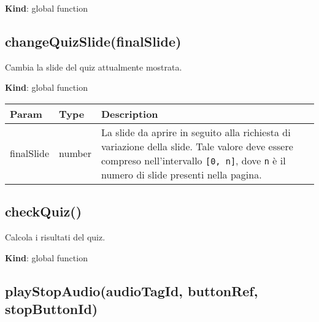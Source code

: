 \textbf{Kind}: global function\\

\hypertarget{changequizslidefinalslide-1}{%
\subsection{changeQuizSlide(finalSlide)}\label{changequizslidefinalslide-1}}

Cambia la slide del quiz attualmente mostrata.

\textbf{Kind}: global function

\begin{longtable}[]{@{}lll@{}}
\toprule
\begin{minipage}[b]{0.30\columnwidth}\raggedright
Param\strut
\end{minipage} & \begin{minipage}[b]{0.30\columnwidth}\raggedright
Type\strut
\end{minipage} & \begin{minipage}[b]{0.30\columnwidth}\raggedright
Description\strut
\end{minipage}\tabularnewline
\midrule
\endhead
\begin{minipage}[t]{0.30\columnwidth}\raggedright
finalSlide\strut
\end{minipage} & \begin{minipage}[t]{0.30\columnwidth}\raggedright
number\strut
\end{minipage} & \begin{minipage}[t]{0.30\columnwidth}\raggedright
La slide da aprire in seguito alla richiesta di variazione della slide.
Tale valore deve essere compreso nell'intervallo \texttt{{[}0,\ n{]}},
dove \texttt{n} è il numero di slide presenti nella pagina.\strut
\end{minipage}\tabularnewline
\bottomrule
\end{longtable}

\hypertarget{checkquiz-1}{%
\subsection{checkQuiz()}\label{checkquiz-1}}

Calcola i risultati del quiz.

\textbf{Kind}: global function\\

\hypertarget{playstopaudioaudiotagid-buttonref-stopbuttonid-1}{%
\subsection{playStopAudio(audioTagId, buttonRef,
stopButtonId)}\label{playstopaudioaudiotagid-buttonref-stopbuttonid-1}}

